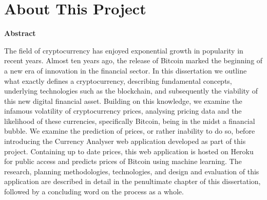 
\newpage
\section*{About This Project}
\vspace{10mm}
\centerline{\textbf{Abstract}}

The field of cryptocurrency has enjoyed exponential growth in popularity in recent years. Almost ten years ago, the release of Bitcoin marked the beginning of a new era of innovation in the financial sector. In this dissertation we outline what exactly defines a cryptocurrency, describing fundamental concepts, underlying technologies such as the blockchain, and subsequently the viability of this new digital financial asset. Building on this knowledge, we examine the infamous volatility of cryptocurrency prices, analysing pricing data and the likelihood of these currencies, specifically Bitcoin, being in the midst a financial bubble. We examine the prediction of prices, or rather inability to do so, before introducing the Currency Analyser web application developed as part of this project. Containing up to date prices, this web application is hosted on Heroku for public access and predicts prices of Bitcoin using machine learning. The research, planning methodologies, technologies, and design and evaluation of this application are described in detail in the penultimate chapter of this dissertation, followed by a concluding word on the process as a whole.
\vspace{10mm}

